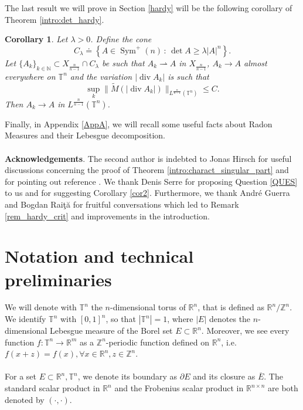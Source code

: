\documentclass[10pt,reqno]{amsart}
\numberwithin{equation}{section}
\newcommand{\R}{\mathbb{R}}
\newcommand{\Z}{\mathbb{Z}}
\newcommand{\T}{\mathbb{T}}
\newcommand{\N}{\mathbb{N}}
\DeclareMathOperator{\dv}{div}
\DeclareMathOperator{\Sym}{Sym}
\theoremstyle{plain}
\newtheorem{Cor}[Teo]{Corollary}
\theoremstyle{definition}
\theoremstyle{remark}
\begin{document}
\\
\\
The last result we will prove in Section \ref{hardy} will be the following corollary of Theorem \ref{intro:det_hardy}.
\begin{Cor}\label{intro:hardystrong}
Let $\lambda>0$. Define the cone 
$$
C_\lambda\doteq \left\{ A\in \Sym^+(n)\, : \, \det A \geq \lambda |A|^n \right\}.
$$
Let $\{A_k\}_{k\in \N}\subset X_\frac{n}{n-1}\cap C_\lambda$ be such that $A_k \rightharpoonup A$ in $X_\frac{n}{n-1}$, $A_k\rightarrow A$ almost everywhere on $\T^n$ and the variation $|\dv A_k|$ is such that
\[
\sup_k\|\tilde M \left(|\dv A_k|\right) \|_{L^\frac{n}{n - 1}(\T^n)} \le C.
\]
Then $A_k\rightarrow A$ in $ L^\frac{n}{n-1}(\T^n)$.
\end{Cor}

Finally, in Appendix \ref{AppA}, we will recall some useful facts about Radon Measures and their Lebesgue decomposition.
\\
\\
\textbf{ Acknowledgements}. 
The second author is indebted to Jonas Hirsch for useful discussions concerning the proof of Theorem \ref{intro:charact_singular_part} and for pointing out reference \cite{DLDPHM}. We thank Denis Serre for proposing Question \ref{QUES} to us and for suggesting Corollary \ref{cor2}.  Furthermore, we thank Andr\'e Guerra and Bogdan Rai\c{t}{\u{a}} for fruitful conversations which led to Remark \ref{rem_hardy_crit} and improvements in the introduction.

\section{Notation and technical preliminaries}\label{Sec:notations}

We will denote with $\T^n$ the $n$-dimensional torus of $\R^n$, that is defined as $\R^n/\Z^n$. We identify $\T^n$ with $[0,1]^n$, so that $|\T^n| = 1$, where $|E|$ denotes the $n$-dimensional Lebesgue measure of the Borel set $E\subset \R^n$. Moreover, we see every function $f: \T^n \to \R^m$ as a $\Z^n$-periodic function defined on $\R^n$, i.e. $f(x+ z) = f(x),\forall x \in \R^n, z \in \Z^n$.
\\
\\
For a set $E \subset \R^n,\T^n$, we denote its boundary as $\partial E$ and its closure as $\overline{E}$. The standard scalar product in $\R^n$ and the Frobenius scalar product in $\R^{n\times n}$ are both denoted by $(\cdot,\cdot)$.
\end{document}
